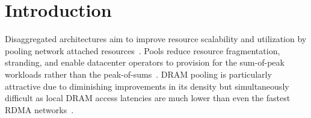 \section{Introduction}
\label{sec:intro}




Disaggregated architectures aim to improve resource scalability and utilization by pooling network
attached resources~\cite{dredbox,firebox,blade-server,legoos}. Pools reduce resource fragmentation,
stranding, and enable datacenter operators to provision for the sum-of-peak workloads rather than
the peak-of-sums~\cite{dsnf,supernic}. DRAM pooling is particularly attractive due to diminishing
improvements in its density but simultaneously difficult as local DRAM access latencies are much
lower than even the fastest RDMA
networks~\cite{fastswap,3po,kona,infiniswap,hydra,leap,legoos,dilos}.

